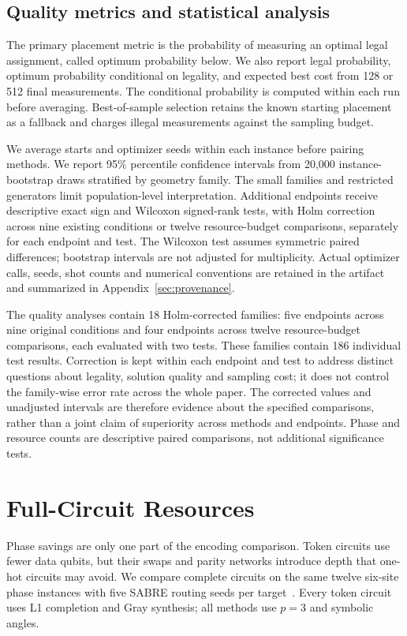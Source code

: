 \documentclass[manuscript,screen,review]{acmart}
\begin{document}
\subsection{Quality metrics and statistical analysis}
The primary placement metric is the probability of measuring an optimal
legal assignment, called optimum probability below. We also report legal
probability, optimum probability conditional on legality, and expected
best cost from 128 or 512 final measurements. The conditional probability
is computed within each run before averaging. Best-of-sample selection
retains the known starting placement as a fallback and charges illegal
measurements against the sampling budget.

We average starts and optimizer seeds within each instance before pairing
methods. We report 95\% percentile confidence intervals from 20,000
instance-bootstrap draws stratified by geometry family. The small families
and restricted generators limit population-level interpretation.
Additional endpoints receive descriptive exact sign and Wilcoxon
signed-rank tests, with Holm correction across nine existing conditions or
twelve resource-budget comparisons, separately for each endpoint and test.
The Wilcoxon test assumes symmetric paired differences; bootstrap intervals
are not adjusted for multiplicity. Actual optimizer calls, seeds, shot counts
and numerical conventions are retained in the artifact and summarized in
Appendix~\ref{sec:provenance}.

The quality analyses contain 18 Holm-corrected families: five endpoints
across nine original conditions and four endpoints across twelve
resource-budget comparisons, each evaluated with two tests. These families
contain 186 individual test results. Correction is kept within each
endpoint and test to address distinct questions about legality, solution
quality and sampling cost; it does not control the family-wise error rate
across the whole paper. The corrected values and unadjusted intervals are
therefore evidence about the specified comparisons, rather than a joint
claim of superiority across methods and endpoints. Phase and resource
counts are descriptive paired comparisons, not additional significance tests.



\section{Full-Circuit Resources}
\label{sec:resources}
Phase savings are only one part of the encoding comparison. Token circuits
use fewer data qubits, but their swaps and parity networks introduce depth
that one-hot circuits may avoid. We compare complete circuits on the same
twelve six-site phase instances with five SABRE routing seeds per
target~\cite{li2019sabre}. Every
token circuit uses L1 completion and Gray synthesis; all methods use $p=3$
and symbolic angles.
\end{document}
